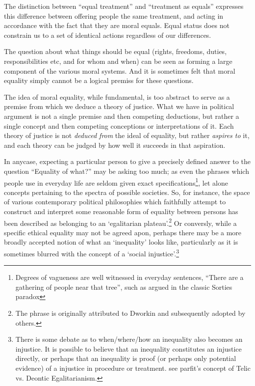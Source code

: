 \begin{displayquote}
The distinction between ``equal treatment'' and ``treatment as equals'' expresses this difference between offering people the same treatment, and acting in accordance with the fact that they are moral equals. Equal status does not constrain us to a set of identical actions regardless of our differences.\cite{whatisbasicequalitynathan}
\end{displayquote}

The question about what things should be equal (rights, freedoms, duties, responsibilities etc, and for whom and when) can be seen as forming a large component of the various moral systems. And it is sometimes felt that moral equality simply cannot be a logical premiss for these questions.

\begin{displayquote}
The idea of moral equality, while fundamental, is too abstract to serve as a premise from which we deduce a theory of justice. What we have in political argument is not a single premise and then competing deductions, but rather a single concept and then competing conceptions or interpretations of it. Each theory of justice is not \textit{deduced from} the ideal of equality, but rather \textit{aspires to} it, and each theory can be judged by how well it succeeds in that aspiration.\cite{kymlicka2002contemporary}
\end{displayquote}

In anycase, expecting a particular person to give a precisely defined answer to the question ``Equality of what?'' may be asking too much; as even the phrases which people use in everyday life are seldom given exact specifications\footnote{Degrees of vagueness are well witnessed in everyday sentences, ``There are a gathering of people near that tree'', such as argued in the classic Sorties paradox\cite{frances_2018}}, let alone concepts pertaining to the spectra of possible societies.
So, for instance, the space of various contemporary political philosophies which faithfully attempt to construct and interpret some reasonable form of equality between persons has been described as belonging to an `egalitarian plateau'.\footnote{The phrase is originally attributed to Dworkin and subsequently adopted by others.}\cite{Brown2007}
Or conversly, while a specific ethical equality may not be agreed apon, perhaps there may be a more broadly accepted notion of what an `inequality' looks like,
particularly as it is sometimes blurred with the concept of a `social injustice'.\footnote{There is some debate as to when/where/how an inequality also becomes an injustice. It is possible to believe that an inequality constitutes an injustice directly, or perhaps that an inequality is proof (or perhaps only potential evidence) of a injustice in procedure or treatment. see parfit's concept of Telic vs. Deontic Egalitarianism.\cite{equalityandpriorityparfit}}

